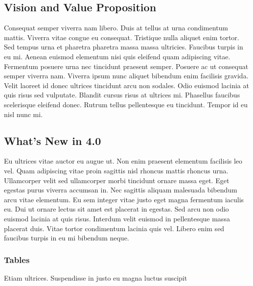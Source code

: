 \documentclass[peerreview]{ieeesyscoin}
\begin{document}
\subsection{Vision and Value Proposition}
Consequat semper viverra nam libero. Duis at tellus at urna condimentum mattis. Viverra vitae congue eu consequat. Tristique nulla aliquet enim tortor. Sed tempus urna et pharetra pharetra massa massa ultricies. Faucibus turpis in eu mi. Aenean euismod elementum nisi quis eleifend quam adipiscing vitae. Fermentum posuere urna nec tincidunt praesent semper. Posuere ac ut consequat semper viverra nam. Viverra ipsum nunc aliquet bibendum enim facilisis gravida. Velit laoreet id donec ultrices tincidunt arcu non sodales. Odio euismod lacinia at quis risus sed vulputate. Blandit cursus risus at ultrices mi. Phasellus faucibus scelerisque eleifend donec. Rutrum tellus pellentesque eu tincidunt. Tempor id eu nisl nunc mi.

\subsection{What's New in 4.0}
Eu ultrices vitae auctor eu augue ut. Non enim praesent elementum facilisis leo vel. Quam adipiscing vitae proin sagittis nisl rhoncus mattis rhoncus urna. Ullamcorper velit sed ullamcorper morbi tincidunt ornare massa eget. Eget egestas purus viverra accumsan in. Nec sagittis aliquam malesuada bibendum arcu vitae elementum. Eu sem integer vitae justo eget magna fermentum iaculis eu. Dui ut ornare lectus sit amet est placerat in egestas. Sed arcu non odio euismod lacinia at quis risus. Interdum velit euismod in pellentesque massa placerat duis. Vitae tortor condimentum lacinia quis vel. Libero enim sed faucibus turpis in eu mi bibendum neque.

\subsubsection{Tables}
{Etiam ultrices. Suspendisse in justo eu magna luctus suscipit}
\end{document}
